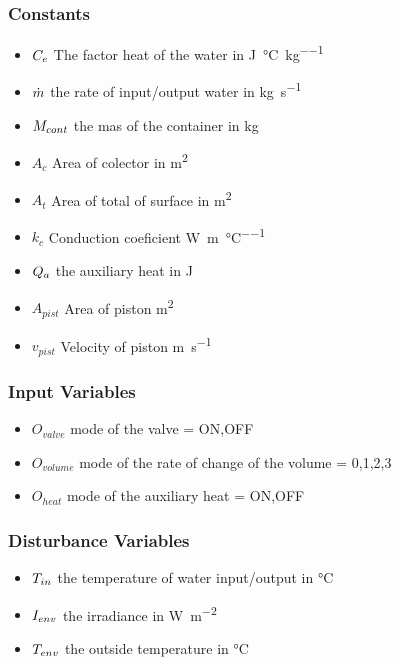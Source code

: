 \documentclass[a4paper,12pt,twoside,openright]{book}
\begin{document}
\subsubsection{Constants}
\begin{itemize}
\item
  $C_e$ The factor heat of the water in \si{\joule\per\degreeCelsius\per\kilogram}
\item
  $\dot{m}$ the rate of input/output water in \si{\kilogram\per\second}
\item
  $M_{cont}$ the mas of the container in \si{\kilogram}
\item
  $A_c$ Area of colector in \si{\metre^2}
\item
  $A_t$ Area of total of surface in \si{\metre^2}
\item
  $k_c$ Conduction coeficient \si{\watt\per\metre\per\degreeCelsius}
\item
  $Q_{a}$ the auxiliary heat in \si{\joule}
\item
  $A_{pist}$ Area of piston \si{\metre^2}
\item
  $v_{pist}$ Velocity of piston \si{\metre\per\second}
  
\end{itemize}

\subsubsection{Input Variables}
\begin{itemize}
\item
  $O_{valve}$ mode of the valve = {ON,OFF}
\item
  $O_{volume}$ mode of the rate of change of the volume = {0,1,2,3}
\item
  $O_{heat}$ mode of the auxiliary heat = {ON,OFF}


\end{itemize}

\subsubsection{Disturbance Variables}
\begin{itemize}
\item 
  $T_{in}$ the temperature of water input/output in \si{\degreeCelsius}
\item
  $I_{env}$ the irradiance in \si{\watt\per\square\metre}
\item
  $T_{env}$ the outside temperature in \si{\degreeCelsius}
\end{itemize}
\end{document}
